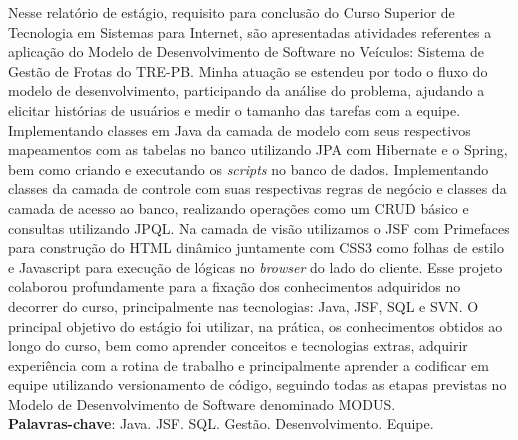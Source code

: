 
\begin{resumo}[RESUMO]
\begin{SingleSpacing}



Nesse relatório de estágio, requisito para conclusão do Curso Superior de Tecnologia em Sistemas para Internet, são apresentadas atividades referentes a aplicação do Modelo de Desenvolvimento de Software no Veículos: Sistema de Gestão de Frotas do TRE-PB. Minha atuação se estendeu por todo o fluxo do modelo de desenvolvimento, participando da análise do problema, ajudando a elicitar histórias de usuários e medir o tamanho das tarefas com a equipe. Implementando classes em Java da camada de modelo com seus respectivos mapeamentos com as tabelas no banco utilizando JPA com Hibernate e o Spring, bem como criando e executando os \textit{scripts} no banco de dados. Implementando classes da camada de controle com suas respectivas regras de negócio e classes da camada de acesso ao banco, realizando operações como um CRUD básico e consultas utilizando JPQL. Na camada de visão utilizamos o JSF com Primefaces para construção do HTML dinâmico juntamente com CSS3 como folhas de estilo e Javascript para execução de lógicas no \textit{browser} do lado do cliente. Esse projeto colaborou profundamente para a fixação dos conhecimentos adquiridos no decorrer do curso, principalmente nas tecnologias: Java, JSF, SQL e SVN. O principal objetivo do estágio foi utilizar, na prática, os conhecimentos obtidos ao longo do curso, bem como aprender conceitos e tecnologias extras, adquirir experiência com a rotina de trabalho e principalmente aprender a codificar em equipe utilizando versionamento de código, seguindo todas as etapas previstas no Modelo de Desenvolvimento de Software denominado MODUS. \\

\textbf{Palavras-chave}: Java. JSF. SQL. Gestão. Desenvolvimento. Equipe.

\end{SingleSpacing}
\end{resumo}

